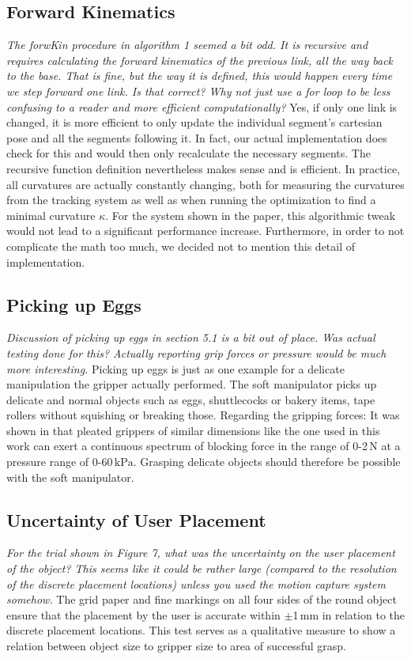 \documentclass[letterpaper, 10 pt, twocolumn, conference]{article}
\newcommand{\unit}[1]{\ensuremath{\, \mathrm{#1}}} %
\begin{document}
\subsection{Forward Kinematics}
\textit{The forwKin procedure in algorithm 1 seemed a bit odd. It is recursive and requires calculating the forward kinematics of the previous link, all the way back to the base. That is fine, but the way it is defined, this would happen every time we step forward one link. Is that correct? Why not just use a for loop to be less confusing to a reader and more efficient computationally?}
%
Yes, if only one link is changed, it is more efficient to only update the individual segment's cartesian pose and all the segments following it. In fact, our actual implementation does check for this and would then only recalculate the necessary segments.  The recursive function definition nevertheless makes sense and is efficient. In practice, all curvatures are actually constantly changing, both for measuring the curvatures from the tracking system as well as when running the optimization to find a minimal curvature $\kappa$. For the system shown in the paper, this algorithmic tweak would not lead to a significant performance increase. Furthermore, in order to not complicate the math too much, we decided not to mention this detail of implementation. 
%
\subsection{Picking up Eggs}
\textit{Discussion of picking up eggs in section 5.1 is a bit out of place. Was actual testing done for this? Actually reporting grip forces or pressure would be much more interesting.}
%
Picking up eggs is just as one example for a delicate manipulation the gripper actually performed. The soft manipulator picks up delicate and normal objects such as eggs, shuttlecocks or bakery items, tape rollers without squishing or breaking those. 
Regarding the gripping forces:
It was shown in \cite{marchese2015recipe} that pleated grippers of similar dimensions like the one used in this work can exert a continuous spectrum of blocking force in the range of 0-2\unit{N} at a pressure range of 0-60\unit{kPa}. Grasping delicate objects should therefore be possible with the soft manipulator.
%
\subsection{Uncertainty of User Placement}
\textit{For the trial shown in Figure 7, what was the uncertainty on the user placement of the object? This seems like it could be rather large (compared to the resolution of the discrete placement locations) unless you used the motion capture system somehow.}
%
The grid paper and fine markings on all four sides of the round object ensure that the placement by the user is accurate within $\pm$1\unit{mm} in relation to the discrete placement locations. This test serves as a qualitative measure to show a relation between object size to gripper size to area of successful grasp.
%
\end{document}
